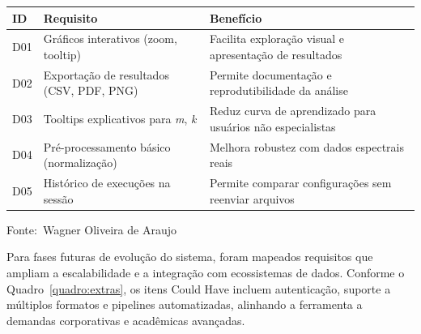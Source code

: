 \documentclass[12pt,a4paper]{article}
\newcommand{\oautor}{Wagner Oliveira de Araujo}
\begin{document}
\begin{quadro}[ht]
\centering
\small
\caption{Requisitos desejáveis do sistema (Should Have)}
\label{quadro:desejaveis}
\begin{threeparttable}
\begin{tabularx}{\textwidth}{|l|X|X|} \hline
\textbf{ID} & \textbf{Requisito} & \textbf{Benefício} \\ \hline
D01 & Gráficos interativos (zoom, tooltip) & Facilita exploração visual e apresentação de resultados \\ \hline
D02 & Exportação de resultados (CSV, PDF, PNG) & Permite documentação e reprodutibilidade da análise \\ \hline
D03 & Tooltips explicativos para \textit{m}, \textit{k} & Reduz curva de aprendizado para usuários não especialistas \\ \hline
D04 & Pré-processamento básico (normalização) & Melhora robustez com dados espectrais reais \\ \hline
D05 & Histórico de execuções na sessão & Permite comparar configurações sem reenviar arquivos \\ \hline
\end{tabularx}
\begin{tablenotes}[flushleft]
\footnotesize
\item Fonte:~\oautor
\end{tablenotes}
\end{threeparttable}
\end{quadro}

Para fases futuras de evolução do sistema, foram mapeados requisitos que ampliam a escalabilidade e a integração com ecossistemas de dados. Conforme o Quadro~\ref{quadro:extras}, os itens Could Have incluem autenticação, suporte a múltiplos formatos e pipelines automatizadas, alinhando a ferramenta a demandas corporativas e acadêmicas avançadas.
\end{document}

